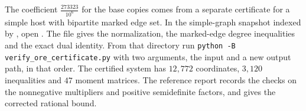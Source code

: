 The coefficient $\frac{273323}{10^6}$ for the base copies comes
from a separate certificate for a simple host with bipartite marked
edge set. In the simple-graph snapshot indexed by
, open
. The file
 gives the normalization, the
marked-edge degree inequalities and the exact dual identity.
From that directory run \texttt{python -B verify\_ore\_certificate.py}
with two arguments, the input 
and a new output path, in that order.
The certified system has $12{,}772$ coordinates, $3{,}120$ inequalities
and $47$ moment matrices. The reference report
 records the checks on the
nonnegative multipliers and positive semidefinite factors, and gives
the corrected rational bound.
